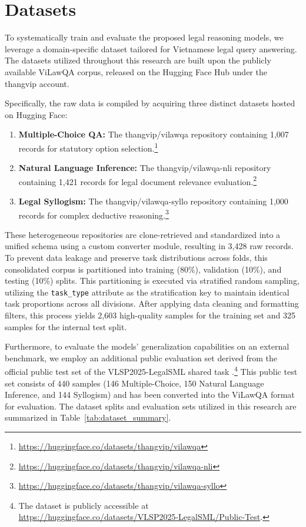 \section{Datasets}

To systematically train and evaluate the proposed legal reasoning models, we leverage a domain-specific dataset tailored for Vietnamese legal query answering. The datasets utilized throughout this research are built upon the publicly available ViLawQA corpus, released on the Hugging Face Hub under the thangvip account.

Specifically, the raw data is compiled by acquiring three distinct datasets hosted on Hugging Face:
\begin{enumerate}
    \item \textbf{Multiple-Choice QA:} The thangvip/vilawqa repository containing 1,007 records for statutory option selection.\footnote{\url{https://huggingface.co/datasets/thangvip/vilawqa}}
    \item \textbf{Natural Language Inference:} The thangvip/vilawqa-nli repository containing 1,421 records for legal document relevance evaluation.\footnote{\url{https://huggingface.co/datasets/thangvip/vilawqa-nli}}
    \item \textbf{Legal Syllogism:} The thangvip/vilawqa-syllo repository containing 1,000 records for complex deductive reasoning.\footnote{\url{https://huggingface.co/datasets/thangvip/vilawqa-syllo}}
\end{enumerate}

These heterogeneous repositories are clone-retrieved and standardized into a unified schema using a custom converter module, resulting in 3,428 raw records. To prevent data leakage and preserve task distributions across folds, this consolidated corpus is partitioned into training (80\%), validation (10\%), and testing (10\%) splits. This partitioning is executed via stratified random sampling, utilizing the \texttt{task\_type} attribute as the stratification key to maintain identical task proportions across all divisions. After applying data cleaning and formatting filters, this process yields 2,603 high-quality samples for the training set and 325 samples for the internal test split.

Furthermore, to evaluate the models' generalization capabilities on an external benchmark, we employ an additional public evaluation set derived from the official public test set of the VLSP2025-LegalSML shared task \parencite{le-etal-2025-overview}.\footnote{The dataset is publicly accessible at \url{https://huggingface.co/datasets/VLSP2025-LegalSML/Public-Test}.} This public test set consists of 440 samples (146 Multiple-Choice, 150 Natural Language Inference, and 144 Syllogism) and has been converted into the ViLawQA format for evaluation. The dataset splits and evaluation sets utilized in this research are summarized in Table~\ref{tab:dataset_summary}.

